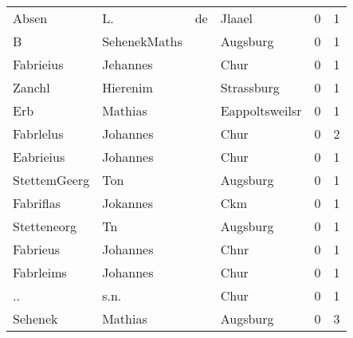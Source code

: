 \begin{tabular}{llllrr}
                    Absen &                                 L. &          de &                                      Jlaael &          0 &         1 \\
                        B &                       SehenekMaths &             &                                    Augsburg &          0 &         1 \\
                Fabrieius &                           Jehannes &             &                                        Chur &          0 &         1 \\
                   Zanchl &                           Hierenim &             &                                  Strassburg &          0 &         1 \\
                      Erb &                            Mathias &             &                              Eappoltsweilsr &          0 &         1 \\
                Fabrlelus &                           Johannes &             &                                        Chur &          0 &         2 \\
                Eabrieius &                           Johannes &             &                                        Chur &          0 &         1 \\
             StettemGeerg &                                Ton &             &                                    Augsburg &          0 &         1 \\
                Fabriflas &                           Jokannes &             &                                         Ckm &          0 &         1 \\
              Stetteneorg &                                 Tn &             &                                    Augsburg &          0 &         1 \\
                 Fabrieus &                           Johannes &             &                                        Chnr &          0 &         1 \\
                Fabrleims &                           Johannes &             &                                        Chur &          0 &         1 \\
                       .. &                               s.n. &             &                                        Chur &          0 &         1 \\
                  Sehenek &                            Mathias &             &                                    Augsburg &          0 &         3 \\

\end{tabular}
